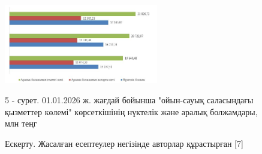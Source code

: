 \begin{figure}[H]
	\centering
	\includegraphics[width=0.6\textwidth]{media/ekon/image6.6}
	\caption*{5 - сурет. 01.01.2026 ж. жағдай бойынша "ойын-сауық саласындағы
  қызметтер көлемі" көрсеткішінің нүктелік және аралық болжамдары, млн
  теңг}
  \caption*{Ескерту. Жасалған есептеулер негізінде авторлар құрастырған {[}7{]}}
\end{figure}

